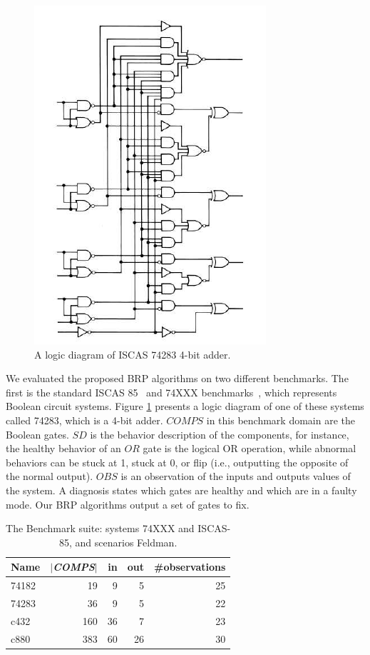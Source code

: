 \documentclass[a4paper,11pt]{report}
\newcommand{\COMPS}{\textit{COMPS}}
\newcommand{\SD}{\textit{SD}}
\newcommand{\OBS}{\textit{OBS}}
\begin{document}
\begin{figure}{}%
\begin{center}
  \includegraphics[width=0.5\columnwidth]{74283.png}
  \caption{A logic diagram of ISCAS 74283 4-bit adder.}
  \label{fig:74283}
\end{center}
\end{figure}

We evaluated the proposed BRP algorithms on two different benchmarks. The first is the standard ISCAS 85~\cite{Brglez89} and 74XXX benchmarks~\cite{Hansen99}, which represents Boolean circuit systems. Figure \ref{fig:74283} presents a logic diagram of one of these systems called 74283, which is a 4-bit adder. $\COMPS$ in this benchmark domain are the Boolean gates. $\SD$ is the behavior description of the components, for instance, the healthy behavior of an $\textit{OR}$ gate is the logical OR operation, while abnormal behaviors can be stuck at 1, stuck at 0, or flip (i.e., outputting the opposite of the normal output).  $\OBS$ is an observation of the inputs and outputs values of the system. A diagnosis states which gates are healthy and which are in a faulty mode. 
Our BRP algorithms output a set of gates to fix. 

\begin{table}\centering
{\small
\begin{tabular}{|l|r|r|r|r|}
\hline
 {\bf Name} & {\bf $|${\tiny \COMPS}$|$} & {\bf in} & {\bf out} & {\bf \#observations} \\
\hline
    74182  & 19    & 9    & 5    & 25 \\
    74283  & 36    & 9    & 5    & 22 \\
\hline
    c432   & 160   & 36   & 7    & 23\\
    c880   & 383   & 60   & 26   &  30\\
\hline
\end{tabular}
\caption{The Benchmark suite: systems  {\small 74XXX} and
         {\small ISCAS-85}, and scenarios Feldman.}
\label{tab:systems}
}
\end{table}%
\end{document}
